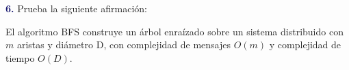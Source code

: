 \newpage
\textbf{\textcolor{MidnightBlue}{6.}}
Prueba la siguiente afirmación:

El algoritmo BFS construye un árbol enraízado sobre un sistema distribuido con $m$ aristas y diámetro D, con complejidad de mensajes $O(m)$ y complejidad de tiempo $O(D)$.